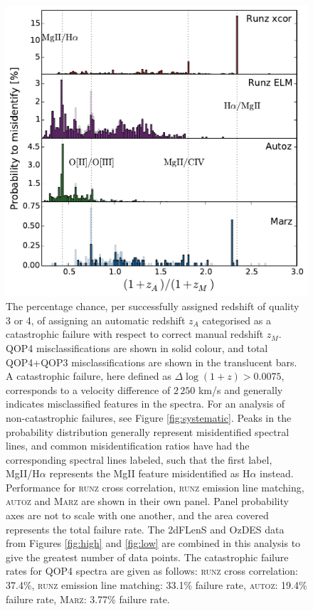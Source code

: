 \documentclass[iop]{emulateapj}
\newcommand{\runz}{\textsc{runz}}
\newcommand{\autoz}{\textsc{autoz}}
\newcommand{\marz}{\textsc{Marz}}
\begin{document}
\begin{figure}[h]
\centering
\includegraphics[width=\columnwidth]{errorRateqop.pdf}
\caption{The percentage chance, per successfully assigned redshift of quality 3 or 4, of assigning an automatic redshift $z_A$ categorised as a catastrophic failure with respect to correct manual redshift $z_M$. QOP4 misclassifications are shown in solid colour, and total QOP4+QOP3 misclassifications are shown in the translucent bars. A catastrophic failure, here defined as $\Delta \log(1 + z) > 0.0075$, corresponds to a velocity difference of $2\,250$ km/s and generally indicates misclassified features in the spectra. For an analysis of non-catastrophic failures, see Figure \ref{fig:systematic}. Peaks in the probability distribution generally represent misidentified spectral lines, and common misidentification ratios have had the corresponding spectral lines labeled, such that the first label, MgII/H$\alpha$ represents the MgII feature misidentified as H$\alpha$ instead. Performance for \runz{} cross correlation, \runz{} emission line matching, \autoz{} and \marz{} are shown in their own panel. Panel probability axes are not to scale with one another, and the area covered represents the total failure rate. The 2dFLenS and OzDES data from Figures \ref{fig:high} and \ref{fig:low} are combined in this analysis to give the greatest number of data points. The catastrophic failure rates for QOP4 spectra are given as follows: \runz{} cross correlation: 37.4\%, \runz{} emission line matching: 33.1\% failure rate, \autoz{}: 19.4\% failure rate, \marz{}: 3.77\% failure rate.}
\label{fig:f4}
\end{figure}
\end{document}
